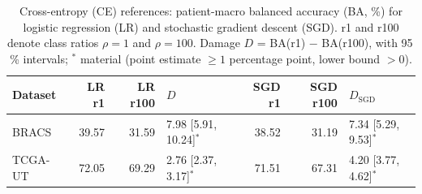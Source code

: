 \begin{table}[t]\centering\small
\caption{Cross-entropy (CE) references: patient-macro balanced accuracy (BA, \%) for logistic regression (LR) and stochastic gradient descent (SGD). r1 and r100 denote class ratios $\rho=1$ and $\rho=100$. Damage $D$ = BA(r1) $-$ BA(r100), with 95\,\% intervals; $^{*}$ material (point estimate $\geq 1$ percentage point, lower bound $> 0$).}
\label{tab:baselines}
\begin{tabular}{lrrlrrl}\toprule
Dataset & LR r1 & LR r100 & $D$ & SGD r1 & SGD r100 & $D_\mathrm{SGD}$ \\ \midrule
BRACS & 39.57 & 31.59 & 7.98 [5.91, 10.24]$^{*}$ & 38.52 & 31.19 & 7.34 [5.29, 9.53]$^{*}$ \\
TCGA-UT & 72.05 & 69.29 & 2.76 [2.37, 3.17]$^{*}$ & 71.51 & 67.31 & 4.20 [3.77, 4.62]$^{*}$ \\
\bottomrule\end{tabular}\end{table}

